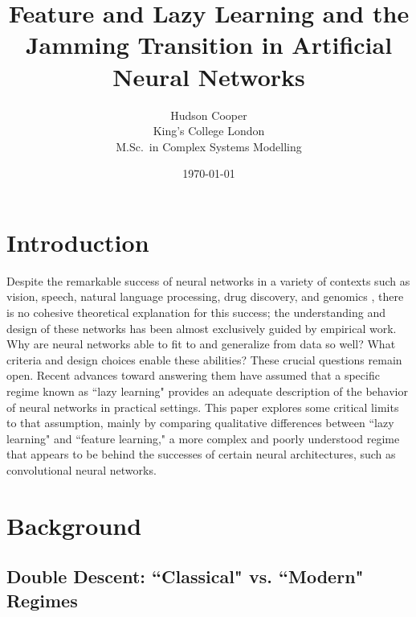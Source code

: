 \documentclass[a4paper, 12pt]{article}
\begin{document}
\title{\bf Feature and Lazy Learning and the Jamming Transition in Artificial Neural Networks}
\author{
    Hudson Cooper\\ %
    King's College London\\
    M.Sc.\ in Complex Systems Modelling
}
\date{\today}

\begin{titlingpage}
\maketitle
\begin{abstract}
\lipsum[1]
\end{abstract}
\end{titlingpage}

\section{Introduction}
Despite the remarkable success of neural networks in a variety of contexts such as vision, speech, natural language processing, drug discovery, and genomics \cite{lecunDeepLearning2015}, there is no cohesive theoretical explanation for this success; the understanding and design of these networks has been almost exclusively guided by empirical work. \\

Why are neural networks able to fit to and generalize from data so well? What criteria and design choices enable these abilities? These crucial questions remain open. Recent advances toward answering them have assumed that a specific regime known as ``lazy learning" provides an adequate description of the behavior of neural networks in practical settings. This paper explores some critical limits to that assumption, mainly by comparing qualitative differences between ``lazy learning" and ``feature learning," a more complex and poorly understood regime that appears to be behind the successes of certain neural architectures, such as convolutional neural networks. 

\section{Background}

\subsection{Double Descent: ``Classical" vs. ``Modern" Regimes}
\end{document}
